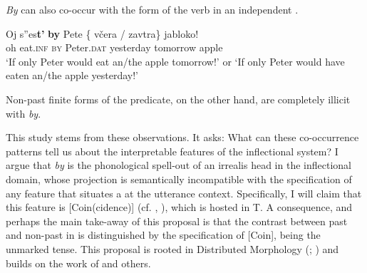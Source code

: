 \documentclass[output=paper,modfonts,newtxmath,hidelinks,]{langscibook}
\begin{document}
\noindent \textit{By} can also co-occur with the  form of the verb in an independent .

\ea \label{10:ex3}
\gll Oj s”es\textbf{t’} \textbf{by} Pete \{\hspace{-2pt} včera / zavtra\} jabloko!\\
     oh eat.\textsc{inf} \textsc{by} Peter.\textsc{dat} {} yesterday {} tomorrow apple\\
\glt `If only Peter would eat an/the apple tomorrow!' or
\glt `If only Peter would have eaten an/the apple yesterday!'\\\hfill \citep[10]{Asarina2006}
\z

\noindent Non-past finite forms of the predicate, on the other hand, are completely illicit with \textit{by}.

\ea \label{10:ex4}
	\z
\z

\noindent This study stems from these observations. It asks: What can these co-occurrence patterns tell us about the interpretable features of the  inflectional system? I argue that \textit{by} is the phonological spell-out of an irrealis head in the  inflectional domain, whose projection is semantically incompatible with the specification of any feature that situates a  at the utterance context. Specifically, I will claim that this feature is [Coin(cidence)] (cf. \citealt{RitterWiltschko2005}, \citealt{RitterWiltschko2009}), which is hosted in T. A consequence, and perhaps the main take-away of this proposal is that the contrast between past and non-past in  is distinguished by the specification of [Coin],  being the unmarked tense. This proposal is rooted in Distributed Morphology (\citealt{HalleMarantz1993}; \citealt{EmbickNoyer2007}) and builds on the  work of \citet{Cowper2002,Cowper2005} and others.
\end{document}
